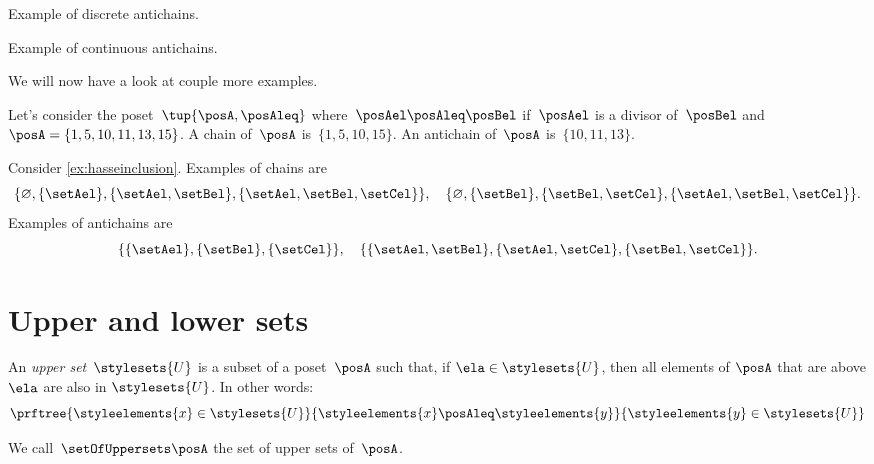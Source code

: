 \begin{marginfigure}
  \begin{center}
  \end{center}
  \caption{Example of discrete antichains.}
  \label{fig:antichain}
\end{marginfigure}

\begin{marginfigure}
  \begin{center}
  \end{center}
  \caption{Example of continuous antichains.}
  \label{fig:antichain_2}
\end{marginfigure}

We will now have a look at couple more examples.
\begin{example}
  Let's consider the poset~$\tup{\posA,\posAleq}$ where~$\posAel \posAleq \posBel$ if~$\posAel$ is a divisor of~$\posBel$ and~$\posA=\{1,5,10,11,13,15\}$.
  A chain of~$\posA$ is~$\{1,5,10,15\}$. An antichain of~$\posA$ is~$\{10,11,13\}$.
\end{example}

\begin{example}
  Consider \cref{ex:hasseinclusion}. Examples of chains are
  \begin{equation}
    \{\varnothing,\{\setAel\},\{\setAel,\setBel\},\{\setAel,\setBel,\setCel\}\}, \quad  \{\varnothing,\{\setBel\},\{\setBel,\setCel\},\{\setAel,\setBel,\setCel\}\}.
  \end{equation}
  Examples of antichains are
  \begin{equation}
    \{\{\setAel\},\{\setBel\},\{\setCel\}\}, \quad \{ \{\setAel,\setBel\},\{\setAel,\setCel\}, \{\setBel,\setCel\}\}.
  \end{equation}
\end{example}

\section{Upper and lower sets}
\label{sec:UpperLowerSets}


\begin{definition}
  \label{def:upperset}
  An \emph{upper set}~$\stylesets{U}$ is a subset of a poset~$\posA$ such
  that, if $\ela \in \stylesets{U}$, then all elements of $\posA$ that are above $\ela$ are also in $\stylesets{U}$. In other words:
  \begin{equation}
    \prftree{\styleelements{x}\in \stylesets{U}}{\styleelements{x}\posAleq \styleelements{y}}{\styleelements{y}\in \stylesets{U}}
  \end{equation}
\end{definition}
We call~$\setOfUppersets \posA$ the set of upper sets of~$\posA$.

